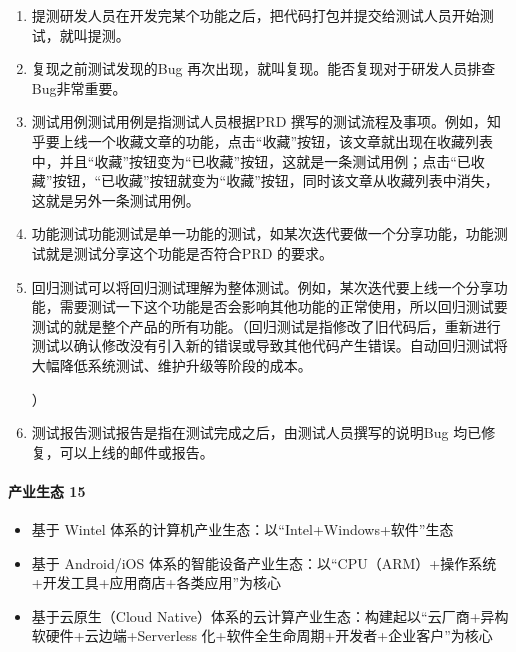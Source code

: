\documentclass[letterpaper,10pt,english]{sphinxmanual}
\begin{document}
\begin{enumerate}
%
\item {} 
提测研发人员在开发完某个功能之后，把代码打包并提交给测试人员开始测试，就叫提测。

\item {} 
复现之前测试发现的Bug
再次出现，就叫复现。能否复现对于研发人员排查Bug非常重要。

\item {} 
测试用例测试用例是指测试人员根据PRD
撰写的测试流程及事项。例如，知乎要上线一个收藏文章的功能，点击“收藏”按钮，该文章就出现在收藏列表中，并且“收藏”按钮变为“已收藏”按钮，这就是一条测试用例；点击“已收藏”按钮，“已收藏”按钮就变为“收藏”按钮，同时该文章从收藏列表中消失，这就是另外一条测试用例。

\item {} 
功能测试功能测试是单一功能的测试，如某次迭代要做一个分享功能，功能测试就是测试分享这个功能是否符合PRD
的要求。

\item {} 
回归测试可以将回归测试理解为整体测试。例如，某次迭代要上线一个分享功能，需要测试一下这个功能是否会影响其他功能的正常使用，所以回归测试要测试的就是整个产品的所有功能。（回归测试是指修改了旧代码后，重新进行测试以确认修改没有引入新的错误或导致其他代码产生错误。自动回归测试将大幅降低系统测试、维护升级等阶段的成本。%
\begin{footnote}[443]\sphinxAtStartFootnote
{}
%
\end{footnote}）

\item {} 
测试报告测试报告是指在测试完成之后，由测试人员撰写的说明Bug
均已修复，可以上线的邮件或报告。

\end{enumerate}


\paragraph{产业生态 15\sphinxfootnotemark[444]}
\label{\detokenize{chapter_idea/understand_tech:id31}}%
\begin{footnotetext}[444]\sphinxAtStartFootnote
{}
%
\end{footnotetext}\ignorespaces \begin{itemize}
\item {} 
基于 Wintel 体系的计算机产业生态：以“Intel+Windows+软件”生态

\item {} 
基于 Android/iOS
体系的智能设备产业生态：以“CPU（ARM）+操作系统+开发工具+应用商店+各类应用”为核心

\item {} 
基于云原生（Cloud
Native）体系的云计算产业生态：构建起以“云厂商+异构软硬件+云边端+Serverless
化+软件全生命周期+开发者+企业客户”为核心

\end{itemize}
\end{document}

